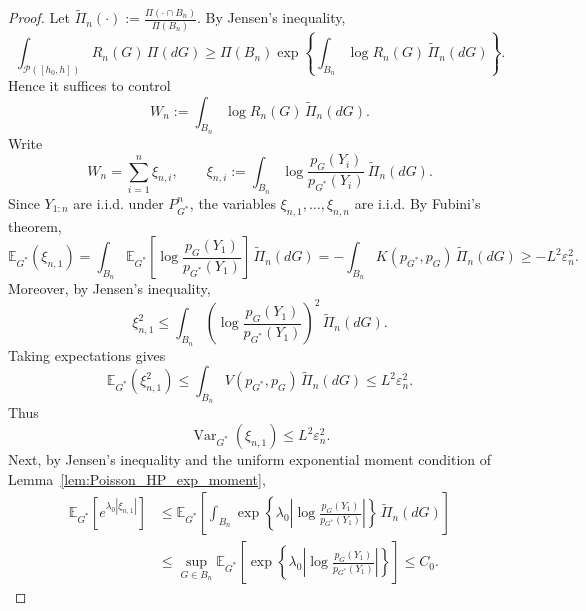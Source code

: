 \documentclass[twoside,12pt]{article}
\newcommand{\E}{\mathds{E}}
\begin{document}
\begin{proof}
Let $\widetilde\Pi_n(\cdot):=\frac{\Pi(\cdot\cap B_n)}{\Pi(B_n)}$. By Jensen's inequality,
\begin{displaymath}
\int_{\mathcal P([h_{0},h])} R_n(G)\,\Pi(dG)\ge\Pi(B_n)\exp\!\left\{\int_{B_n}\log R_n(G)\,\widetilde\Pi_n(dG)\right\}.
\end{displaymath}
Hence it suffices to control
\begin{displaymath}
W_n:=\int_{B_n}\log R_n(G)\,\widetilde\Pi_n(dG).
\end{displaymath}
Write
\begin{displaymath}
W_n=\sum_{i=1}^n \xi_{n,i},\qquad\xi_{n,i}:=\int_{B_n}\log\frac{p_G(Y_i)}{p_{G^\ast}(Y_i)}\,\widetilde\Pi_n(dG).
\end{displaymath}
Since $Y_{1:n}$ are i.i.d. under $P_{G^\ast}^n$, the variables $\xi_{n,1},\dots,\xi_{n,n}$ are i.i.d. By Fubini's theorem,
\begin{displaymath}
\E_{G^\ast}(\xi_{n,1})=\int_{B_n}\E_{G^\ast}\!\left[\log\frac{p_G(Y_1)}{p_{G^\ast}(Y_1)}\right]\,\widetilde\Pi_n(dG)=-\int_{B_n}K(p_{G^\ast},p_G)\,\widetilde\Pi_n(dG)\ge
-L^2\varepsilon_n^2.
\end{displaymath}
Moreover, by Jensen's inequality,
\begin{displaymath}
\xi_{n,1}^2\le\int_{B_n}\left(\log\frac{p_G(Y_1)}{p_{G^\ast}(Y_1)}\right)^2\,\widetilde\Pi_n(dG).
\end{displaymath}
Taking expectations gives
\begin{displaymath}
\E_{G^\ast}(\xi_{n,1}^2)\le\int_{B_n}V(p_{G^\ast},p_G)\,\widetilde\Pi_n(dG)\le L^2\varepsilon_n^2.
\end{displaymath}
Thus
\begin{displaymath}
\operatorname{Var}_{G^\ast}(\xi_{n,1})\le L^2\varepsilon_n^2.
\end{displaymath}
Next, by Jensen's inequality and the uniform exponential moment condition of Lemma~\ref{lem:Poisson_HP_exp_moment},
\begin{displaymath}
\begin{split}
\E_{G^\ast}\!\left[e^{\lambda_0|\xi_{n,1}|}\right]
&\le\E_{G^\ast}\!\left[\int_{B_n}\exp\!\left\{\lambda_0\left|\log\frac{p_G(Y_1)}{p_{G^\ast}(Y_1)}\right|\right\}\,\widetilde\Pi_n(dG)\right]  \\
&\le\sup_{G\in B_n}\E_{G^\ast}\!\left[\exp\!\left\{\lambda_0\left|\log\frac{p_G(Y_1)}{p_{G^\ast}(Y_1)}\right|\right\}\right]\le C_0.
\end{split}
\end{displaymath}

\end{proof}
\end{document}
